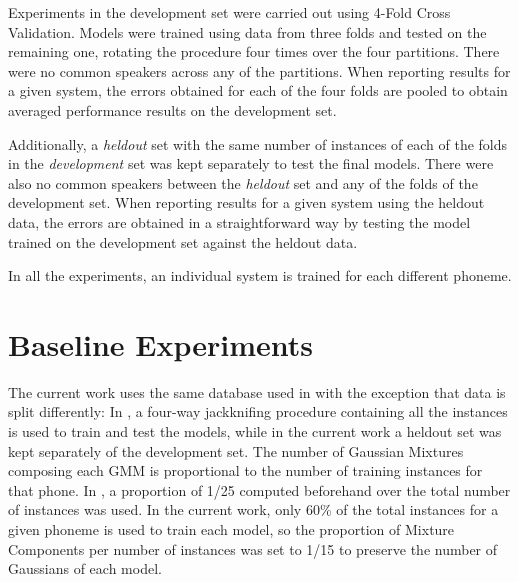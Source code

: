 Experiments in the development set were carried out using 4-Fold Cross Validation. Models
were trained using data from three folds and tested on the remaining one, rotating the
procedure four times over the four partitions. There were no common speakers across any of
the partitions. When reporting results for a given system, the errors obtained for each of the
four folds are pooled to obtain averaged performance results on the development set.

Additionally, a \textit{heldout} set with the same number of instances of each of the folds
in the \textit{development} set
was kept separately to test the final models. There were also no common speakers between
the \textit{heldout} set and any of the folds of the development set. When reporting results
for a given system using the heldout data, the errors are obtained in a straightforward way
by testing the model trained on the development set against the heldout data.

In all the experiments, an individual system is trained for each different phoneme.

\section{Baseline Experiments}


The current work uses the same database used in \cite{main} with the exception that
data is split differently:
In \cite{main}, a four-way jackknifing procedure containing all the instances is used to train
and test the models, while in the current work a heldout set was kept separately of the development
set. The number of Gaussian Mixtures composing each GMM is proportional to the number of
training instances for that phone. In \cite{main}, a proportion of 1/25 computed
beforehand over the total number of instances was used. In the current work, only 60\% of the
total instances for a given phoneme is used to train each model, so the proportion of Mixture
Components per number of instances was set to 1/15 to preserve the number of Gaussians of each
model.

